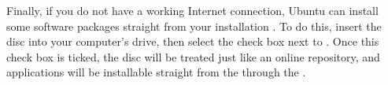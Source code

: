 Finally, if you do not have a working Internet connection, Ubuntu can install
some software packages straight from your installation . To do this,
insert the disc into your computer's  drive, then select the
check box next to .
Once this check box is ticked, the disc will be treated just like an online
repository, and applications will be installable straight from the 
through the .


\begin{comment}
Not sure about this bit - probably needs to be fleshed out some more for next release --jaminday
\begin{enumerate}
  \item \textbf{Official repositories}, the standard method of downloading
    software. By getting software through the official repositories you ensure
    that your software is free of viruses or any other malware, that it is
    stable, and that it works with Ubuntu.
  \item \textbf{Third-party repositories} that you can add to expand your
    software sources. These repositories are not as reliable as the official
    ones: the repository maintainer can put whatever they want into them. There
    is no solid guarantee that the software inside them is secure, stable, or
    that it works with your system. 
    Read more instructions on this matter at \seclink{sec:software-sources}.
  \item \textbf{Installers / deb packages} that you can download from software
    websites, \acronym{CD}s, \acronym{USB} drives, etc. This method is the most insecure of all.
    You should only obtain software this way when you trust the source. If you
    are new to Ubuntu, then you are probably accustomed to obtain software this
    way as it's similar to .exe files in Windows.
\end{enumerate}
\end{comment}

